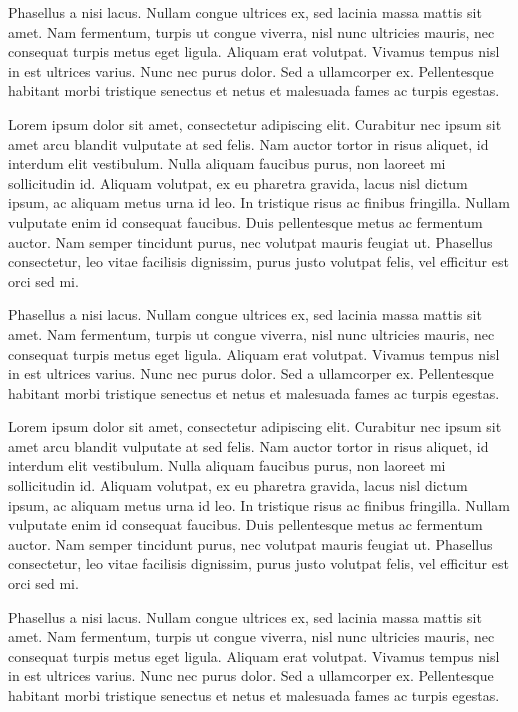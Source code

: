 \documentclass[
  letterpaper,
  DIV=11,
  numbers=noendperiod]{scrreprt}
\begin{document}
Phasellus a nisi lacus. Nullam congue ultrices ex, sed lacinia massa
mattis sit amet. Nam fermentum, turpis ut congue viverra, nisl nunc
ultricies mauris, nec consequat turpis metus eget ligula. Aliquam erat
volutpat. Vivamus tempus nisl in est ultrices varius. Nunc nec purus
dolor. Sed a ullamcorper ex. Pellentesque habitant morbi tristique
senectus et netus et malesuada fames ac turpis egestas.

Lorem ipsum dolor sit amet, consectetur adipiscing elit. Curabitur nec
ipsum sit amet arcu blandit vulputate at sed felis. Nam auctor tortor in
risus aliquet, id interdum elit vestibulum. Nulla aliquam faucibus
purus, non laoreet mi sollicitudin id. Aliquam volutpat, ex eu pharetra
gravida, lacus nisl dictum ipsum, ac aliquam metus urna id leo. In
tristique risus ac finibus fringilla. Nullam vulputate enim id consequat
faucibus. Duis pellentesque metus ac fermentum auctor. Nam semper
tincidunt purus, nec volutpat mauris feugiat ut. Phasellus consectetur,
leo vitae facilisis dignissim, purus justo volutpat felis, vel efficitur
est orci sed mi.

Phasellus a nisi lacus. Nullam congue ultrices ex, sed lacinia massa
mattis sit amet. Nam fermentum, turpis ut congue viverra, nisl nunc
ultricies mauris, nec consequat turpis metus eget ligula. Aliquam erat
volutpat. Vivamus tempus nisl in est ultrices varius. Nunc nec purus
dolor. Sed a ullamcorper ex. Pellentesque habitant morbi tristique
senectus et netus et malesuada fames ac turpis egestas.

\newpage

Lorem ipsum dolor sit amet, consectetur adipiscing elit. Curabitur nec
ipsum sit amet arcu blandit vulputate at sed felis. Nam auctor tortor in
risus aliquet, id interdum elit vestibulum. Nulla aliquam faucibus
purus, non laoreet mi sollicitudin id. Aliquam volutpat, ex eu pharetra
gravida, lacus nisl dictum ipsum, ac aliquam metus urna id leo. In
tristique risus ac finibus fringilla. Nullam vulputate enim id consequat
faucibus. Duis pellentesque metus ac fermentum auctor. Nam semper
tincidunt purus, nec volutpat mauris feugiat ut. Phasellus consectetur,
leo vitae facilisis dignissim, purus justo volutpat felis, vel efficitur
est orci sed mi.

Phasellus a nisi lacus. Nullam congue ultrices ex, sed lacinia massa
mattis sit amet. Nam fermentum, turpis ut congue viverra, nisl nunc
ultricies mauris, nec consequat turpis metus eget ligula. Aliquam erat
volutpat. Vivamus tempus nisl in est ultrices varius. Nunc nec purus
dolor. Sed a ullamcorper ex. Pellentesque habitant morbi tristique
senectus et netus et malesuada fames ac turpis egestas.
\end{document}
